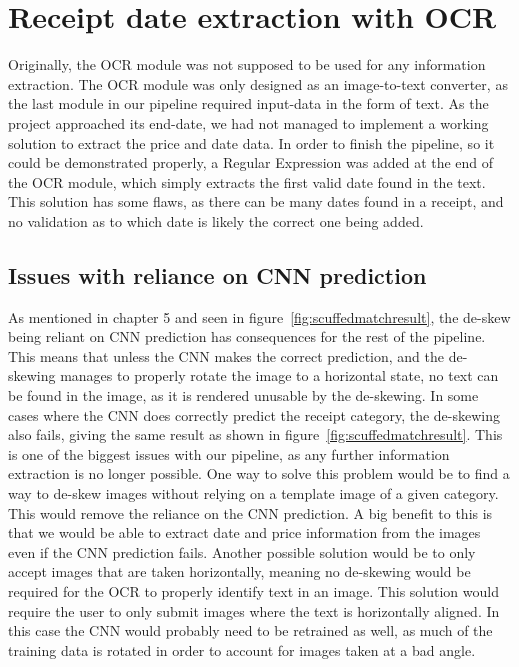 \section{Receipt date extraction with OCR}\label{sec:receipt-date-extraction-with-ocr}
Originally, the OCR module was not supposed to be used for any information extraction.
The OCR module was only designed as an image-to-text converter, as the last module in our pipeline required input-data in the form of text.
As the project approached its end-date, we had not managed to implement a working solution to extract the price and date data.
In order to finish the pipeline, so it could be demonstrated properly, a Regular Expression was added at the end of the OCR module, which simply extracts the first valid date found in the text.
This solution has some flaws, as there can be many dates found in a receipt, and no validation as to which date is likely the correct one being added.

\subsection{Issues with reliance on CNN prediction}\label{subsec:issues-with-reliance-on-cnn-prediction}
As mentioned in chapter 5 and seen in figure~\ref{fig:scuffedmatchresult}, the de-skew being reliant on CNN prediction
has consequences for the rest of the pipeline.
This means that unless the CNN makes the correct prediction, and the de-skewing manages to properly rotate the image to a horizontal state, no text can be found in the image, as it is rendered unusable by the de-skewing.
In some cases where the CNN does correctly predict the receipt category, the de-skewing also fails, giving the same
result as shown in figure~\ref{fig:scuffedmatchresult}.
This is one of the biggest issues with our pipeline, as any further information extraction is no longer possible.
One way to solve this problem would be to find a way to de-skew images without relying on a template image of a given category.
This would remove the reliance on the CNN prediction.
A big benefit to this is that we would be able to extract date and price information from the images even if the CNN
prediction fails.
Another possible solution would be to only accept images that are taken horizontally, meaning no de-skewing would be required for the OCR to properly identify text in an image.
This solution would require the user to only submit images where the text is horizontally aligned.
In this case the CNN would probably need to be retrained as well, as much of the training data is rotated in order to account for images taken at a bad angle.

